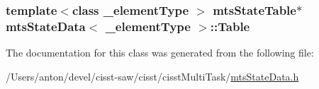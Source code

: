 \subsubsection[{Table}]{\setlength{\rightskip}{0pt plus 5cm}template$<$class \+\_\+element\+Type $>$ {\bf mts\+State\+Table}$\ast$ {\bf mts\+State\+Data}$<$ \+\_\+element\+Type $>$\+::Table\hspace{0.3cm}{\ttfamily [protected]}}\label{classmts_state_data_a8933fedc828fdc64dedb258260be5e4a}


The documentation for this class was generated from the following file\+:\begin{DoxyCompactItemize}
\item 
/\+Users/anton/devel/cisst-\/saw/cisst/cisst\+Multi\+Task/\hyperlink{mts_state_data_8h}{mts\+State\+Data.\+h}\end{DoxyCompactItemize}
